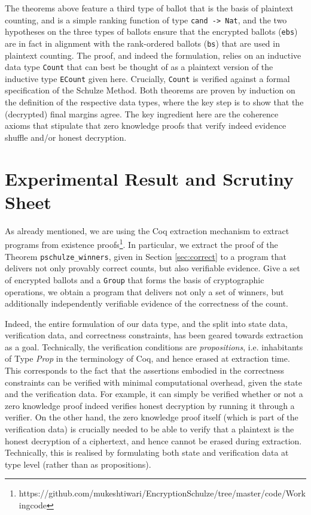 \noindent
The theorems above feature a third type of ballot that is the basis
of plaintext counting, and is a simple ranking function of type
\texttt{cand -> Nat}, and the two hypotheses on the three types of
ballots ensure that the encrypted ballots (\texttt{ebs}) are in fact
in alignment with the rank-ordered ballots (\texttt{bs}) that are
used in plaintext counting. 
The proof, and indeed the formulation, relies on an inductive data
type \texttt{Count} that can best be thought of as a plaintext
version of the inductive type  \texttt{ECount} given here.
Crucially, \texttt{Count} is verified against a formal specification
of the Schulze Method. Both theorems are proven by induction on the
definition of the respective data types, where the key step is to
show that the (decrypted) final margins agree. The key ingredient
here are the coherence axioms that stipulate that zero knowledge
proofs that verify indeed evidence shuffle and/or honest decryption.


     
\section{Experimental Result and Scrutiny Sheet} 

	As already mentioned, we are using  the Coq extraction
mechanism\cite{Letouzey:2003:NEC}  to extract programs from
existence 
proofs\footnote{https://github.com/mukeshtiwari/EncryptionSchulze/tree/master/code/Workingcode}. In particular, we extract the proof of the Theorem
\texttt{pschulze\_winners}, given in Section \ref{sec:correct} to a
program that delivers not only provably correct counts, but also
verifiable evidence.  Give a set of encrypted ballots and a \texttt{Group}
that forms the basis of cryptographic operations, we obtain a program that
delivers not only a set of winners, but additionally independently  verifiable
evidence of the correctness of the count. 

Indeed, the entire formulation of our data type, and the split into
state data, verification data, and correctness constraints, has been
geared towards extraction as a goal. Technically, the verification
conditions are \emph{propositions}, i.e. inhabitants of Type
\emph{Prop} in the terminology of Coq, and hence erased at
extraction time. This corresponds to the fact that the assertions
embodied in the correctness constraints can be verified with minimal
computational overhead, given the state and the verification data.
For example, it can simply be verified whether or not a zero
knowledge proof indeed verifies honest decryption by running
it through a verifier.  On the other hand, the zero knowledge proof
itself (which is part of the verification data) is crucially needed
to be able to verify that a plaintext is the honest decryption of a
ciphertext, and hence cannot be erased during extraction.
Technically, this is realised by formulating both state and
verification data at type level (rather than as propositions). 

